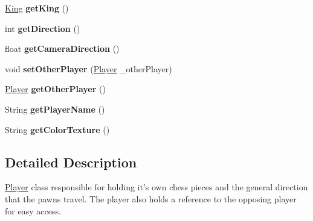 \begin{DoxyCompactItemize}
\item 
\hypertarget{classcontroller_1_1_player_a45539368eae4ca87c67be013487bf530}{\hyperlink{classmodel_1_1pieces_1_1_king}{King} {\bfseries get\-King} ()}\label{classcontroller_1_1_player_a45539368eae4ca87c67be013487bf530}

\item 
\hypertarget{classcontroller_1_1_player_abcbb9063a1c3869c470e35213d7ef4a2}{int {\bfseries get\-Direction} ()}\label{classcontroller_1_1_player_abcbb9063a1c3869c470e35213d7ef4a2}

\item 
\hypertarget{classcontroller_1_1_player_a1ac828358ee773689852e57c8276b041}{float {\bfseries get\-Camera\-Direction} ()}\label{classcontroller_1_1_player_a1ac828358ee773689852e57c8276b041}

\item 
\hypertarget{classcontroller_1_1_player_ac30693c2a47602498b8622dcaf800981}{void {\bfseries set\-Other\-Player} (\hyperlink{classcontroller_1_1_player}{Player} \-\_\-other\-Player)}\label{classcontroller_1_1_player_ac30693c2a47602498b8622dcaf800981}

\item 
\hypertarget{classcontroller_1_1_player_a56768039d96b436827f493324242aaa1}{\hyperlink{classcontroller_1_1_player}{Player} {\bfseries get\-Other\-Player} ()}\label{classcontroller_1_1_player_a56768039d96b436827f493324242aaa1}

\item 
\hypertarget{classcontroller_1_1_player_ad4e558315dda2838b5a1703b5a76c464}{String {\bfseries get\-Player\-Name} ()}\label{classcontroller_1_1_player_ad4e558315dda2838b5a1703b5a76c464}

\item 
\hypertarget{classcontroller_1_1_player_aa7a4928fde7d50da6f6b21d9907a17bb}{String {\bfseries get\-Color\-Texture} ()}\label{classcontroller_1_1_player_aa7a4928fde7d50da6f6b21d9907a17bb}

\end{DoxyCompactItemize}


\subsection{Detailed Description}
\hyperlink{classcontroller_1_1_player}{Player} class responsible for holding it's own chess pieces and the general direction that the pawns travel. The player also holds a reference to the opposing player for easy access.

